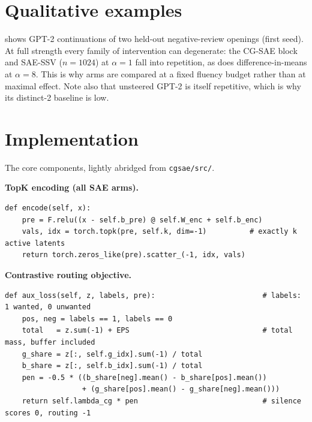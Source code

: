 \documentclass[11pt,a4paper]{article}
\theoremstyle{remark}
\begin{document}
\FloatBarrier
\section{Qualitative examples}
\label{app:qualitative}

 shows GPT-2 continuations of two held-out negative-review openings (first seed).
At full strength every family of intervention can degenerate: the CG-SAE block and SAE-SSV
($n=1024$) at $\alpha=1$ fall into repetition, as does difference-in-means at $\alpha=8$. This
is why arms are compared at a fixed fluency budget rather than at maximal effect. Note also
that unsteered GPT-2 is itself repetitive, which is why its distinct-2 baseline is low.

\begin{table}[!htbp]
  \centering\small
  \caption{\textbf{GPT-2 L7 continuations} under selected interventions.}
  \label{tab:qual}
  
\end{table}

\FloatBarrier
\section{Implementation}
\label{app:code}

The core components, lightly abridged from \texttt{cgsae/src/}.

\medskip\noindent\textbf{TopK encoding (all SAE arms).}\par\nobreak\smallskip
\begin{lstlisting}[style=py]
def encode(self, x):
    pre = F.relu((x - self.b_pre) @ self.W_enc + self.b_enc)
    vals, idx = torch.topk(pre, self.k, dim=-1)          # exactly k active latents
    return torch.zeros_like(pre).scatter_(-1, idx, vals)
\end{lstlisting}

\medskip\noindent\textbf{Contrastive routing objective.}\par\nobreak\smallskip
\begin{lstlisting}[style=py]
def aux_loss(self, z, labels, pre):                         # labels: 1 wanted, 0 unwanted
    pos, neg = labels == 1, labels == 0
    total   = z.sum(-1) + EPS                               # total mass, buffer included
    g_share = z[:, self.g_idx].sum(-1) / total
    b_share = z[:, self.b_idx].sum(-1) / total
    pen = -0.5 * ((b_share[neg].mean() - b_share[pos].mean())
                  + (g_share[pos].mean() - g_share[neg].mean()))
    return self.lambda_cg * pen                             # silence scores 0, routing -1
\end{lstlisting}
\end{document}
